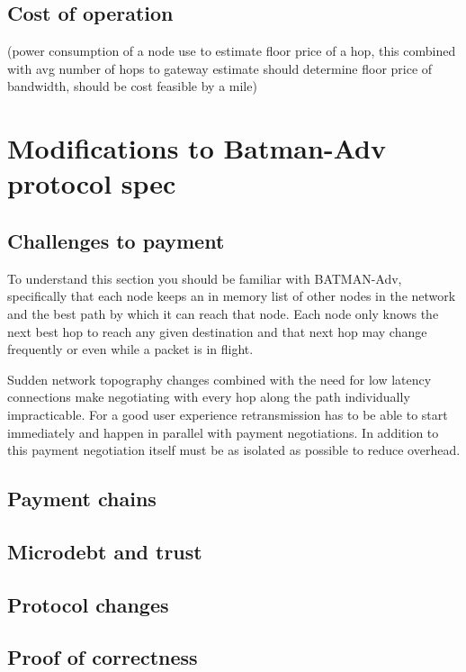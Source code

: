 \documentclass[11pt]{article}
\begin{document}
    \subsection{Cost of operation}
    
    (power consumption of a node use to estimate floor price of a hop, this combined with avg number of hops to gateway estimate should determine floor price of bandwidth, should be cost feasible by a mile) 

\section{Modifications to Batman-Adv protocol spec}

	\subsection{Challenges to payment}
	
	To understand this section you should be familiar with BATMAN-Adv, specifically that each node keeps an in memory list of other nodes in the network and the best path by which it can reach that node. Each node only knows the next best hop to reach any given destination and that next hop may change frequently or even while a packet is in flight. 
	
	Sudden network topography changes combined with the need for low latency connections make negotiating with every hop along the path individually impracticable. For a good user experience retransmission has to be able to start immediately and happen in parallel with payment negotiations. In addition to this payment negotiation itself must be as isolated as possible to reduce overhead. 
	
	\subsection{Payment chains}
	
	\subsection{Microdebt and trust}
	
	\subsection{Protocol changes}
	
	\subsection{Proof of correctness}
	
\end{document}
